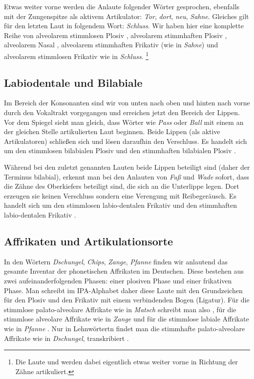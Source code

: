 Etwas weiter vorne werden die Anlaute folgender Wörter gesprochen, ebenfalls mit der Zungenspitze als aktivem Artikulator: \textit{Tor}, \textit{dort}, \textit{neu}, \textit{Sahne}.
Gleiches gilt für den letzten Laut in folgendem Wort: \textit{Schluss}.
Wir haben hier eine komplette Reihe von alveolarem stimmlosen Plosiv \textipa{[t]}, alveolarem stimmhaften Plosiv \textipa{[d]}, alveolarem Nasal \textipa{[n]}, alveolarem stimmhaften Frikativ \textipa{[z]} (wie in \textit{Sahne}) und alveolarem stimmlosen Frikativ \textipa{[s]} wie in \textit{Schluss}.%
\footnote{Die Laute \textipa{[s]} und \textipa{[z]} werden dabei eigentlich etwas weiter vorne in Richtung der Zähne artikuliert.}

\subsection{Labiodentale und Bilabiale}


Im Bereich der Konsonanten sind wir von unten nach oben und hinten nach vorne durch den Vokaltrakt vorgegangen und erreichen jetzt den Bereich der Lippen.
Vor dem Spiegel sieht man gleich, dass Wörter wie \textit{Pass} oder \textit{Ball} mit einem an der gleichen Stelle artikulierten Laut beginnen.
Beide Lippen (als aktive Artikulatoren) schließen sich und lösen daraufhin den Verschluss.
Es handelt sich um den stimmlosen bilabialen Plosiv \textipa{[p]} und den stimmhaften bilabialen Plosiv \textipa{[b]}.

Während bei den zuletzt genannten Lauten beide Lippen beteiligt sind (daher der Terminus bilabial), erkennt man bei den Anlauten von \textit{Fuß} und \textit{Wade} sofort, dass die Zähne des Oberkiefers beteiligt sind, die sich an die Unterlippe legen.
Dort erzeugen sie keinen Verschluss sondern eine Verengung mit Reibegeräusch.
Es handelt sich um den stimmlosen labio-dentalen Frikativ \textipa{[f]} und den stimmhaften labio-dentalen Frikativ \textipa{[v]}.

\subsection{Affrikaten und Artikulationsorte}


In den Wörtern \textit{Dschungel}, \textit{Chips}, \textit{Zange}, \textit{Pfanne} finden wir anlautend das gesamte Inventar der phonetischen Affrikaten im Deutschen.
Diese bestehen aus zwei aufeinanderfolgenden Phasen: einer plosiven Phase und einer frikativen Phase.
Man schreibt im IPA-Alphabet daher diese Laute mit den Grundzeichen für den Plosiv und den Frikativ mit einem verbindenden Bogen (Ligatur).
Für die stimmlose palato-alveolare Affrikate wie in \textit{Matsch} schreibt man also \textipa{[\t{tS}]}, für die stimmlose alveolare Affrikate wie in \textit{Zange} \textipa{[\t{ts}]} und für die stimmlose labiale Affrikate wie in \textit{Pfanne} \textipa{[\t{pf}]}.
Nur in Lehnwörtertn findet man die stimmhafte palato-alveolare Affrikate wie in \textit{Dschungel}, transkribiert \textipa{[\t{dZ}]}.

